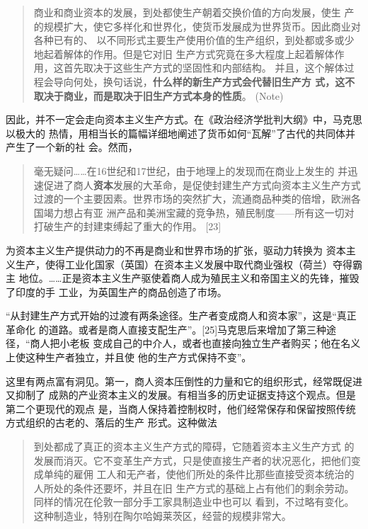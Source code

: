 \begin{quotation}商业和商业资本的发展，到处都使生产朝着交换价值的方向发展，使生
产的规模扩大，使它多样化和世界化，使货币发展成为世界货币。因此商业对各种已有的、
以不同形式主要生产使用价值的生产组织，到处都或多或少地起着解体的作用。但是它对旧
生产方式究竟在多大程度上起着解体作用，这首先取决于这些生产方式的坚固性和内部结构。
并且，这个解体过程会导向何处，换句话说，\textbf{什么样的新生产方式会代替旧生产方
式，这不取决于商业，而是取决于旧生产方式本身的性质}。
(Note)
\end{quotation}

因此，并不一定会走向资本主义生产方式。在《政治经济学批判大纲》中，马克思以极大的
热情，用相当长的篇幅详细地阐述了货币如何“瓦解”了古代的共同体并产生了一个新的社
会。然而，

\begin{quotation}毫无疑问……在16世纪和17世纪，由于地理上的发现而在商业上发生的
并迅速促进了商人\textbf{资本}发展的大革命，是促使封建生产方式向资本主义生产方式
过渡的一个主要因素。世界市场的突然扩大，流通商品种类的倍增，欧洲各国竭力想占有亚
洲产品和美洲宝藏的竞争热，殖民制度——所有这一切对打破生产的封建束缚起了重大的作用。
[23]
\end{quotation}为资本主义生产提供动力的不再是商业和世界市场的扩张，驱动力转换为
资本主义生产，使得工业化国家（英国）在资本主义发展中取代商业强权（荷兰）夺得霸主
地位。……正是资本主义生产驱使着商人成为殖民主义和帝国主义的先锋，摧毁了印度的手
工业，为英国生产的商品创造了市场。

“从封建生产方式开始的过渡有两条途径。生产者变成商人和资本家”，这是“真正革命化
的道路。或者是商人直接支配生产”。[25]马克思后来增加了第三种途径，“商人把小老板
变成自己的中介人，或者也直接向独立生产者购买；他在名义上使这种生产者独立，并且使
他的生产方式保持不变”。

这里有两点富有洞见。第一，商人资本压倒性的力量和它的组织形式，经常既促进又抑制了
成熟的产业资本主义的发展。有相当多的历史证据支持这个观点。但是第二个更现代的观点
是，当商人保持着控制权时，他们经常保存和保留按照传统方式组织的古老的、落后的生产
形式。这种做法
\begin{quotation}到处都成了真正的资本主义生产方式的障碍，它随着资本主义生产方式
的发展而消灭。它不变革生产方式，只是使直接生产者的状况恶化，把他们变成单纯的雇佣
工人和无产者，使他们所处的条件比那些直接受资本统治的人所处的条件还要坏，并且在旧
生产方式的基础上占有他们的剩余劳动。同样的情况在伦敦一部分手工家具制造业中也可以
看到，不过略有变化。这种制造业，特别在陶尔哈姆莱茨区，经营的规模非常大。

\end{quotation}

